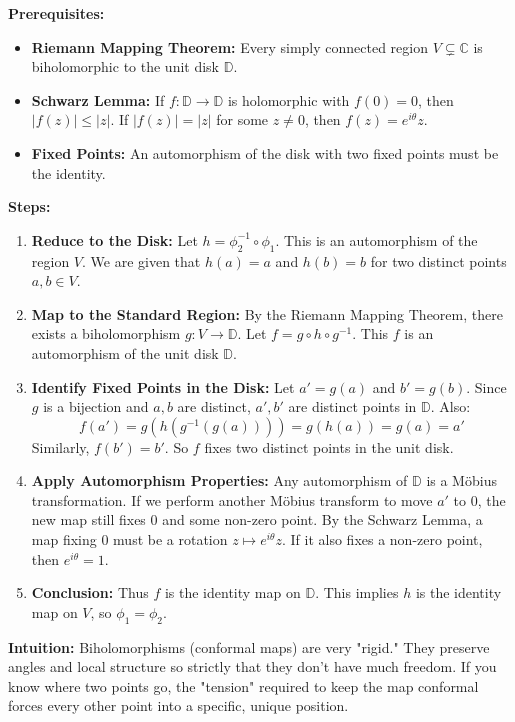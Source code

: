 \begin{solution}
\textbf{Prerequisites:}
\begin{itemize}
    \item \textbf{Riemann Mapping Theorem:} Every simply connected region $V \subsetneq \mathbb{C}$ is biholomorphic to the unit disk $\mathbb{D}$.
    \item \textbf{Schwarz Lemma:} If $f: \mathbb{D} \to \mathbb{D}$ is holomorphic with $f(0)=0$, then $|f(z)| \leq |z|$. If $|f(z)| = |z|$ for some $z \neq 0$, then $f(z) = e^{i\theta}z$.
    \item \textbf{Fixed Points:} An automorphism of the disk with two fixed points must be the identity.
\end{itemize}

\bigskip

\textbf{Steps:}
\begin{enumerate}
    \item \textbf{Reduce to the Disk:} Let $h = \phi_2^{-1} \circ \phi_1$. This is an automorphism of the region $V$. We are given that $h(a) = a$ and $h(b) = b$ for two distinct points $a, b \in V$.
    
    \item \textbf{Map to the Standard Region:} By the Riemann Mapping Theorem, there exists a biholomorphism $g: V \to \mathbb{D}$. Let $f = g \circ h \circ g^{-1}$. This $f$ is an automorphism of the unit disk $\mathbb{D}$.
    
    \item \textbf{Identify Fixed Points in the Disk:} Let $a' = g(a)$ and $b' = g(b)$. Since $g$ is a bijection and $a,b$ are distinct, $a', b'$ are distinct points in $\mathbb{D}$. Also:
    \[ f(a') = g(h(g^{-1}(g(a)))) = g(h(a)) = g(a) = a' \]
    Similarly, $f(b') = b'$. So $f$ fixes two distinct points in the unit disk.

    \item \textbf{Apply Automorphism Properties:} Any automorphism of $\mathbb{D}$ is a M\"obius transformation. If we perform another M\"obius transform to move $a'$ to $0$, the new map still fixes $0$ and some non-zero point. By the Schwarz Lemma, a map fixing $0$ must be a rotation $z \mapsto e^{i\theta}z$. If it also fixes a non-zero point, then $e^{i\theta} = 1$.
    
    \item \textbf{Conclusion:} Thus $f$ is the identity map on $\mathbb{D}$. This implies $h$ is the identity map on $V$, so $\phi_1 = \phi_2$.
\end{enumerate}

\bigskip

\textbf{Intuition:} 
Biholomorphisms (conformal maps) are very "rigid." They preserve angles and local structure so strictly that they don't have much freedom. If you know where two points go, the "tension" required to keep the map conformal forces every other point into a specific, unique position.
\end{solution}

